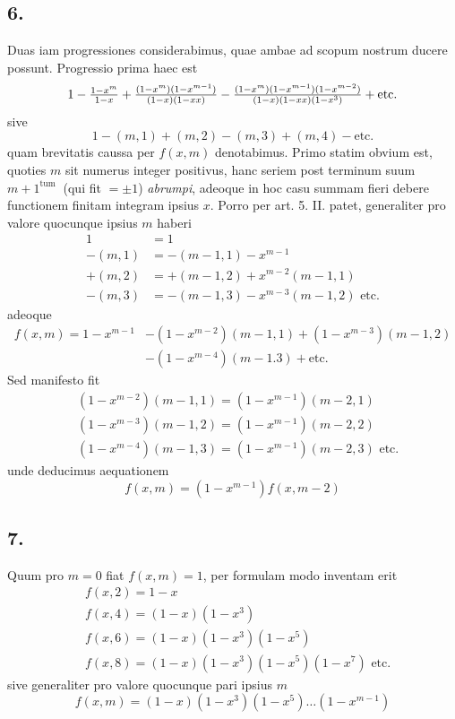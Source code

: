 \documentclass[twoside,12pt, showframe]{memoir}
\let\oldfrac\frac
\def\frac#1#2{\mathchoice{\tfrac{#1}{#2}}{\oldfrac{#1}{#2}}{\genfrac{}{}{}{2}{#1}{#2\mathstrut}}{\genfrac{}{}{}{3}{#1}{#2\mathstrut}}}
\begin{document}
\subsection*{6.}
 
Duas iam progressiones considerabimus, quae ambae ad scopum nostrum ducere possunt. Progressio prima haec est\clearpage\noindent%
\[1-\frac{1-x^{m}}{1-x}+\frac{(1-x^{m})(1-x^{m-1})}{(1-x)(1-x x)}-\frac{(1-x^{m})(1-x^{m-1})(1-x^{m-2})}{(1-x)(1-x x)(1-x^{3})}+\text{etc.}\]
sive
\[1-(m, 1)+(m, 2)-(m, 3)+(m, 4)-\text{etc.}\]
quam brevitatis caussa per \(f(x, m)\) denotabimus. Primo statim obvium est, quoties \(m\) sit numerus integer positivus, hanc seriem post terminum suum \({m+1}^{\text{tum }}\) (qui fit \(= \pm 1\)) \textit{abrumpi}, adeoque in hoc casu summam fieri debere functionem finitam integram ipsius \(x\). Porro per art. 5. II. patet, generaliter pro valore quocunque ipsius \(m\) haberi
\[\begin{aligned}
1 & =1 \\
-(m, 1) & =-(m-1,1)-x^{m-1} \\
+(m, 2) & =+(m-1,2)+x^{m-2}(m-1,1) \\
-(m, 3) & =-(m-1,3)-x^{m-3}(m-1,2) \text{ etc.}
\end{aligned}\]
adeoque
\[\begin{aligned}
f(x, m)=1-x^{m-1}&-(1-x^{m-2})(m-1,1)+(1-x^{m-3})(m-1,2) \\
&-(1-x^{m-4})(m-1.3)+\text{etc.}
\end{aligned}\]
Sed manifesto fit
\[\begin{aligned}
& (1-x^{m-2})(m-1,1)=(1-x^{m-1})(m-2,1) \\
& (1-x^{m-3})(m-1,2)=(1-x^{m-1})(m-2,2) \\
& (1-x^{m-4})(m-1,3)=(1-x^{m-1})(m-2,3) \text{ etc.}
\end{aligned}\]
unde deducimus aequationem
\[f(x, m)=(1-x^{m-1}) f(x, m-2) \tag{1}\]

\subsection*{7.}
 
Quum pro \(m=0\) fiat \(f(x, m)=1\), per formulam modo inventam erit
\[\begin{aligned}
& f(x, 2)=1-x \\
& f(x, 4)=(1-x)(1-x^{3}) \\
& f(x, 6)=(1-x)(1-x^{3})(1-x^{5}) \\
& f(x, 8)=(1-x)(1-x^{3})(1-x^{5})(1-x^{7}) \text{ etc.}
\end{aligned}\]
sive generaliter pro valore quocunque pari ipsius \(m\)
\[f(x, m)=(1-x)(1-x^{3})(1-x^{5}) \ldots (1-x^{m-1}) \tag{2}\]\clearpage\noindent%
\end{document}
